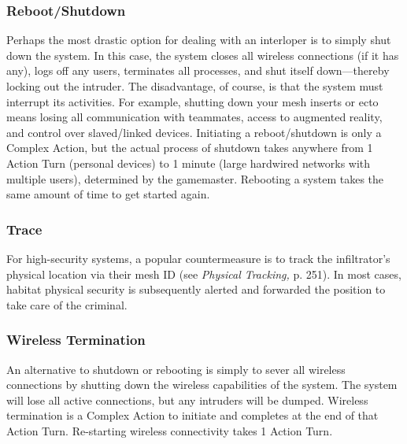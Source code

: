 \subsubsection{Reboot/Shutdown} 

Perhaps the most drastic option for dealing with an interloper is to simply shut down the system. In this case, the system closes all wireless connections (if it has any), logs off any users, terminates all processes, and shut itself down—thereby locking out the intruder. The disadvantage, of course, is that the system must interrupt its activities. For example, shutting down your mesh inserts or ecto means losing all communication with teammates, access to augmented reality, and control over slaved/linked devices. Initiating a reboot/shutdown is only a Complex Action, but the actual process of shutdown takes anywhere from 1 Action Turn (personal devices) to 1 minute (large hardwired networks with multiple users), determined by the gamemaster. Rebooting a system takes the same amount of time to get started again. 



\subsubsection{Trace} 

For high-security systems, a popular countermeasure is to track the infiltrator's physical location via their mesh ID (see \textit{Physical Tracking,} p. 251). In most cases, habitat physical security is subsequently alerted and forwarded the position to take care of the criminal. 

\subsubsection{Wireless Termination} 

An alternative to shutdown or rebooting is simply to sever all wireless connections by shutting down the wireless capabilities of the system. The system will lose all active connections, but any intruders will be dumped. Wireless termination is a Complex Action to initiate and completes at the end of that Action Turn. Re-starting wireless connectivity takes 1 Action Turn. 



